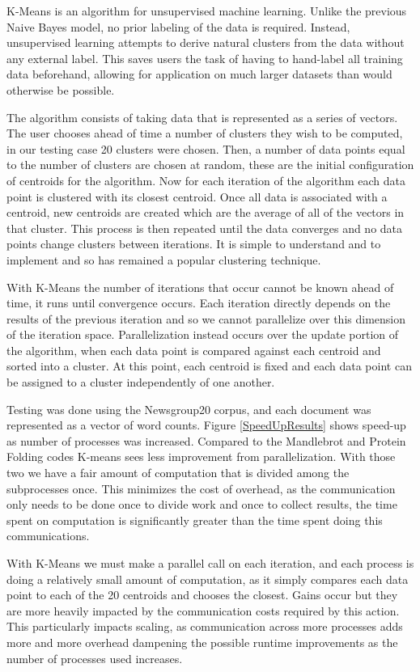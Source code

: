 \documentclass[conference]{IEEEtran}
\begin{document}
K-Means\cite{forgy1965cluster} is an algorithm for unsupervised machine learning. 
Unlike the previous Naive Bayes model, no prior labeling of the data is required.
Instead, unsupervised learning attempts to derive natural clusters from 
the data without any external label.
This saves users the task of having to hand-label all training data 
beforehand, allowing for application on much larger datasets than would 
otherwise be possible.

The algorithm consists of taking data that is represented as a series of vectors.
The user chooses ahead of time a number of clusters they wish to be computed, in
our testing case 20 clusters were chosen. 
Then, a number of data points equal to the number of clusters are chosen at random,
these are the initial configuration of centroids for the algorithm.
Now for each iteration of the algorithm each data point is clustered with its
closest centroid.
Once all data is associated with a centroid, new centroids are created which are the
average of all of the vectors in that cluster.
This process is then repeated until the data converges and no data points change clusters
between iterations.
It is simple to understand and to implement and so has remained  a popular clustering technique.

With K-Means the number of iterations that occur cannot be known ahead of time, it runs
until convergence occurs. 
Each iteration directly depends on the results of the previous iteration and so we cannot parallelize over this dimension of the iteration space.
Parallelization instead occurs over the update portion of the algorithm, when each data 
point is compared against each centroid and sorted into a cluster.
At this point, each centroid is fixed and each data point can be assigned to a cluster
independently of one another.

Testing was done using the Newsgroup20 corpus, and each document was represented as a 
vector of word counts.
Figure \ref{SpeedUpResults} shows speed-up as number of processes was increased.
Compared to the Mandlebrot and Protein Folding codes K-means sees less improvement from parallelization.
With those two we have a fair amount of computation that is divided among the subprocesses once.
This minimizes the cost of overhead, as the communication only needs to be done
once to divide work and once to collect results, the time spent on computation
is significantly greater than the time spent doing this communications.

With K-Means we must make a parallel call on each iteration, and each process is doing 
a relatively small amount of computation, as it simply compares each data point
to each of the 20 centroids and chooses the closest. 
Gains occur but they are more heavily impacted by the communication costs required by 
this action.
This particularly impacts scaling, as communication across more processes adds more and
more overhead dampening the possible runtime improvements as the number of processes used
increases.
\end{document}
